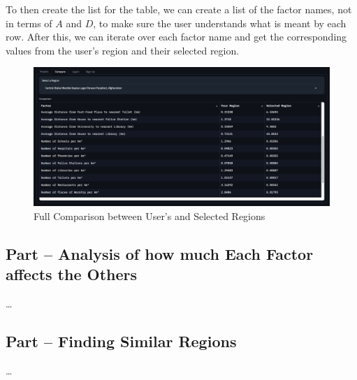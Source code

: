 \documentclass[12pt]{report}
\begin{document}
To then create the list for the table, we can create a list of the factor names, not in terms of $A$ and $D$, to make sure the user understands what is meant by each row. After this, we can iterate over each factor name and get the corresponding values from the user's region and their selected region.

\begin{figure}[H]
\centering
\includegraphics[width=14cm]{ss17.5.png}
\caption{Full Comparison between User's and Selected Regions}\label{fig:ss17.5}
\end{figure}

\begin{center}
\end{center}

\subsection{Part \theparts{} -- Analysis of how much Each Factor affects the Others}
\dots

\subsection{Part \theparts{} -- Finding Similar Regions}
\dots
\end{document}
